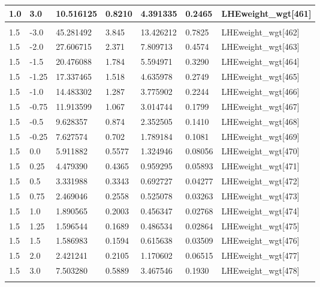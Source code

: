 \begin{table}[!htbp]
\begin{tabular}{lllllll}
    1.0  & 3.0   & 10.516125 & 0.8210        & 4.391335  & 0.2465       & LHEweight\_wgt[461]\\\hline
    &       &           &               &           &              & \\\hline
    1.5  & -3.0  & 45.281492 & 3.845         & 13.426212 & 0.7825       & LHEweight\_wgt[462]\\
    1.5  & -2.0  & 27.606715 & 2.371         & 7.809713  & 0.4574       & LHEweight\_wgt[463]\\
    1.5  & -1.5  & 20.476088 & 1.784         & 5.594971  & 0.3290       & LHEweight\_wgt[464]\\
    1.5  & -1.25 & 17.337465 & 1.518         & 4.635978  & 0.2749       & LHEweight\_wgt[465]\\
    1.5  & -1.0  & 14.483302 & 1.287         & 3.775902  & 0.2244       & LHEweight\_wgt[466]\\
    1.5  & -0.75 & 11.913599 & 1.067         & 3.014744  & 0.1799       & LHEweight\_wgt[467]\\
    1.5  & -0.5  & 9.628357  & 0.874         & 2.352505  & 0.1410       & LHEweight\_wgt[468]\\
    1.5  & -0.25 & 7.627574  & 0.702         & 1.789184  & 0.1081       & LHEweight\_wgt[469]\\
    1.5  & 0.0   & 5.911882  & 0.5577        & 1.324946  & 0.08056      & LHEweight\_wgt[470]\\
    1.5  & 0.25  & 4.479390  & 0.4365        & 0.959295  & 0.05893      & LHEweight\_wgt[471]\\
    1.5  & 0.5   & 3.331988  & 0.3343        & 0.692727  & 0.04277      & LHEweight\_wgt[472]\\
    1.5  & 0.75  & 2.469046  & 0.2558        & 0.525078  & 0.03263      & LHEweight\_wgt[473]\\
    1.5  & 1.0   & 1.890565  & 0.2003        & 0.456347  & 0.02768      & LHEweight\_wgt[474]\\
    1.5  & 1.25  & 1.596544  & 0.1689        & 0.486534  & 0.02864      & LHEweight\_wgt[475]\\
    1.5  & 1.5   & 1.586983  & 0.1594        & 0.615638  & 0.03509      & LHEweight\_wgt[476]\\
    1.5  & 2.0   & 2.421241  & 0.2105        & 1.170602  & 0.06515      & LHEweight\_wgt[477]\\
    1.5  & 3.0   & 7.503280  & 0.5889        & 3.467546  & 0.1930       & LHEweight\_wgt[478]\\\hline
    &       &           &               &           & \\ \hline

\end{tabular}
\end{table}
